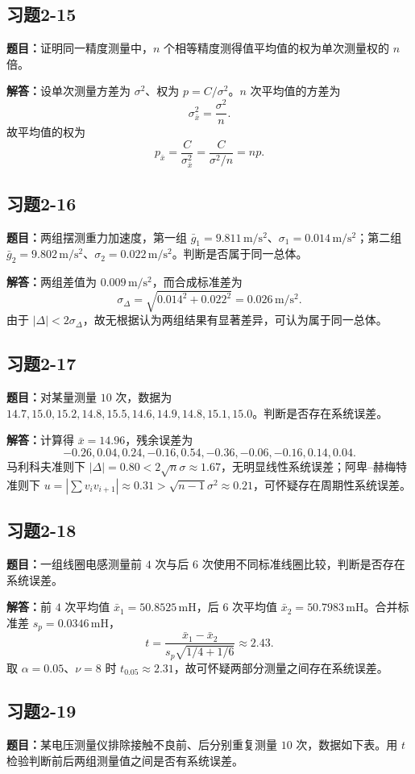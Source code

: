 \documentclass[UTF8,zihao=-4]{ctexart}
\newcommand{\problem}[1]{\subsection*{#1}}
\newcommand{\timu}{\noindent\textbf{题目：}}
\newcommand{\jieda}{\noindent\textbf{解答：}}
\begin{document}
{\problem{习题2-15}
\timu 证明同一精度测量中，$n$ 个相等精度测得值平均值的权为单次测量权的 $n$ 倍。

\jieda 设单次测量方差为 $\sigma^2$、权为 $p=C/\sigma^2$。$n$ 次平均值的方差为
\begin{equation*}
    \sigma_{\bar{x}}^2=\frac{\sigma^2}{n}.
\end{equation*}
故平均值的权为
\begin{equation*}
    p_{\bar{x}}=\frac{C}{\sigma_{\bar{x}}^2}=\frac{C}{\sigma^2/n}=np.
\end{equation*}

\problem{习题2-16}
\timu 两组摆测重力加速度，第一组 $\bar{g}_1=9.811\,\mathrm{m/s^2}$、$\sigma_1=0.014\,\mathrm{m/s^2}$；第二组 $\bar{g}_2=9.802\,\mathrm{m/s^2}$、$\sigma_2=0.022\,\mathrm{m/s^2}$。判断是否属于同一总体。

\jieda 两组差值为 $0.009\,\mathrm{m/s^2}$，而合成标准差为
\begin{equation*}
    \sigma_\Delta=\sqrt{0.014^2+0.022^2}=0.026\,\mathrm{m/s^2}.
\end{equation*}
由于 $|\Delta|<2\sigma_\Delta$，故无根据认为两组结果有显著差异，可认为属于同一总体。

\problem{习题2-17}
\timu 对某量测量 $10$ 次，数据为 $14.7,15.0,15.2,14.8,15.5,14.6,14.9,14.8,15.1,15.0$。判断是否存在系统误差。

\jieda 计算得 $\bar{x}=14.96$，残余误差为
\begin{equation*}
    -0.26,0.04,0.24,-0.16,0.54,-0.36,-0.06,-0.16,0.14,0.04.
\end{equation*}
马利科夫准则下 $|\Delta|=0.80<2\sqrt n\sigma\approx1.67$，无明显线性系统误差；阿卑--赫梅特准则下 $u=|\sum v_iv_{i+1}|\approx0.31>\sqrt{n-1}\sigma^2\approx0.21$，可怀疑存在周期性系统误差。

\problem{习题2-18}
\timu 一组线圈电感测量前 $4$ 次与后 $6$ 次使用不同标准线圈比较，判断是否存在系统误差。

\jieda 前 $4$ 次平均值 $\bar{x}_1=50.8525\,\mathrm{mH}$，后 $6$ 次平均值 $\bar{x}_2=50.7983\,\mathrm{mH}$。合并标准差 $s_p=0.0346\,\mathrm{mH}$，
\begin{equation*}
    t=\frac{\bar{x}_1-\bar{x}_2}{s_p\sqrt{1/4+1/6}}\approx2.43.
\end{equation*}
取 $\alpha=0.05$、$\nu=8$ 时 $t_{0.05}\approx2.31$，故可怀疑两部分测量之间存在系统误差。



\problem{习题2-19}
\timu 某电压测量仪排除接触不良前、后分别重复测量 $10$ 次，数据如下表。用 $t$ 检验判断前后两组测量值之间是否有系统误差。

}
\end{document}
